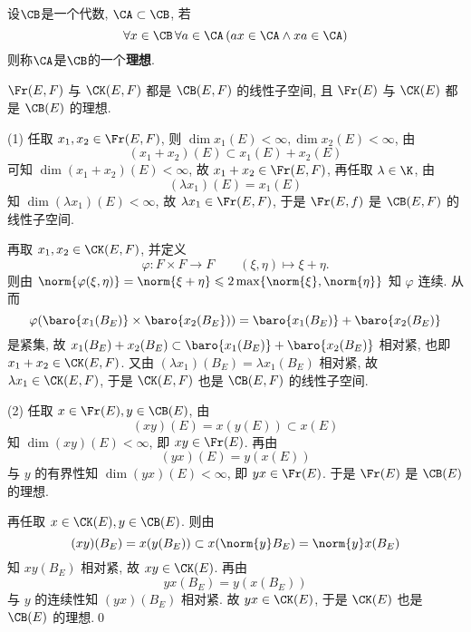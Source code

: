 	\begin{Definition}[理想]
	设$ \CB $是一个代数, $ \CA\subset\CB $, 若
	\[
	\forall x\in\CB\,\forall a\in\CA\,(ax\in\CA\land xa\in\CA)
	\]
	则称$ \CA $是$ \CB $的一个\textbf{理想}.
	\end{Definition}

	\begin{Theorem}
		$ \Fr(E, F) $ 与 $ \CK(E, F) $ 都是 $ \CB(E, F) $ 的线性子空间, 且 $ \Fr(E) $ 与 $ \CK(E) $ 都是 $ \CB(E) $ 的理想.
	\end{Theorem}
	\begin{Proof}
		(1) 任取 $ x_{1}, x_{2}\in\Fr(E, F) $, 则 $ \dim x_{1}(E)<\infty, \dim x_{2}(E)<\infty $, 由
		\[
			(x_{1} + x_{2})(E)\subset x_{1}(E)+x_{2}(E)
		\]
		可知 $ \dim(x_{1}+x_{2})(E)<\infty $, 故 $ x_{1}+x_{2}\in\Fr(E, F) $, 再任取 $ \lambda\in\K $, 由
		\[
			(\lambda x_{1})(E)=x_{1}(E)
		\]
		知 $ \dim(\lambda x_{1})(E)<\infty $, 故 $ \lambda x_{1}\in\Fr(E, F) $, 于是 $ \Fr(E, f) $ 是 $ \CB(E, F) $ 的线性子空间.
		
		再取 $ x_{1}, x_{2}\in \CK(E, F) $, 并定义
		\[
			\varphi: F\times F\to F\qquad (\xi, \eta)\mapsto \xi+\eta.
		\]
		则由 $ \norm{\varphi(\xi, \eta)}=\norm{\xi+\eta}\leqslant 2\max\{ \norm{\xi}, \norm{\eta} \} $ 知 $ \varphi $ 连续. 从而
		\[
			\varphi(\baro{x_{1}(B_{E})}\times \baro{x_{2}(B_{E}}))=\baro{x_{1}(B_{E})}+\baro{x_{2}(B_{E})}
		\]
		是紧集, 故 $ x_{1}(B_{E})+x_{2}(B_{E})\subset\baro{x_{1}(B_{E})}+\baro{x_{2}(B_{E})} $ 相对紧, 也即 $ x_{1}+x_{2}\in\CK(E, F) $. 又由 $ (\lambda x_{1})(B_{E})=\lambda x_{1}(B_{E}) $ 相对紧, 故 $ \lambda x_{1}\in\CK(E, F) $, 于是 $ \CK(E, F) $ 也是 $ \CB(E, F) $ 的线性子空间.

		(2) 任取 $ x\in\Fr(E), y\in\CB(E) $, 由
		\[
			(xy)(E) = x(y(E))\subset x(E)
		\]
		知 $ \dim(xy)(E)<\infty $, 即 $ xy\in\Fr(E) $. 再由
		\[
			(yx)(E)=y(x(E))
		\]
		与 $ y $ 的有界性知 $ \dim(yx)(E)<\infty $, 即 $ yx\in\Fr(E) $. 于是 $ \Fr(E) $ 是 $ \CB(E) $ 的理想.

		再任取 $ x\in\CK(E), y\in\CB(E) $. 则由
		\[
			(xy)(B_{E}) = x(y(B_{E}))\subset x(\norm{y}B_{E}) = \norm{y}x(B_{E})
		\]
		知 $ xy(B_{E}) $ 相对紧, 故 $ xy\in\CK(E) $. 再由
		\[
			yx(B_{E})=y(x(B_{E}))
		\] 
		与 $ y $ 的连续性知 $ (yx)(B_{E}) $ 相对紧. 故 $ yx\in\CK(E) $, 于是 $ \CK(E) $ 也是 $ \CB(E) $ 的理想.\qed
	\end{Proof}

